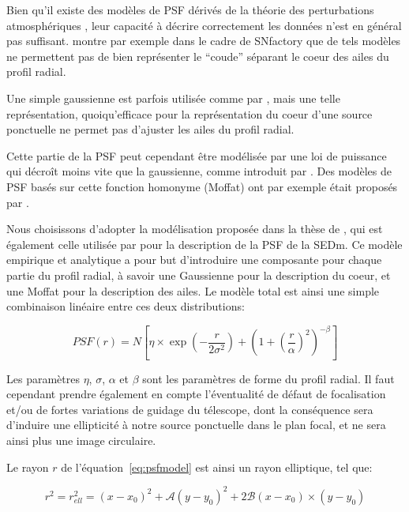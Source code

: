 \documentclass[../main/main.tex]{subfiles}
\begin{document}
Bien qu'il existe des modèles de PSF dérivés de la théorie des
perturbations atmosphériques \citep{Kolmogorov, Fried1966,Tokovinin},
leur capacité à décrire correctement les données n'est en général pas
suffisant. \citet{Butonthese} montre par exemple dans le cadre de
SNfactory que de tels modèles ne
permettent pas de bien représenter le ``coude'' séparant le coeur des ailes du profil radial.

Une simple gaussienne est parfois utilisée comme par \citet{King1971},
mais une telle représentation, quoiqu'efficace pour la représentation du
coeur d'une source ponctuelle ne permet pas d'ajuster les ailes du
profil radial.

Cette partie de la PSF peut cependant être modélisée par une
loi de puissance qui décroît moins vite que la gaussienne, comme
introduit par \citet{Moffat1969}. Des modèles de PSF basés sur cette
fonction homonyme (Moffat) ont par exemple était proposés par
\citet{Racine1996, Trujillo2001}.

Nous choisissons d'adopter la modélisation proposée dans la thèse de
\citet{Butonthese}, qui est également celle utilisée par \citet{pysedm}
pour la description de la PSF de la SEDm. Ce modèle empirique et
analytique a pour but d'introduire une composante pour chaque partie du
profil radial, à savoir une Gaussienne pour la description du coeur, et
une Moffat pour la description des ailes. Le modèle total est ainsi une
simple combinaison linéaire entre ces deux distributions:

\begin{equation}
  \label{eq:psfmodel}
  PSF(r) = N\left[\eta\times\exp\left(- \frac{r}{2\sigma^{2}}\right) +
    \left( 1+\left( \frac{r}{\alpha}\right)^{2}\right)^{-\beta} \right]
\end{equation}

Les paramètres $\eta$, $\sigma$, $\alpha$ et $\beta$ sont les paramètres
de forme du profil radial. Il faut cependant prendre également en compte
l'éventualité de défaut de focalisation et/ou de fortes variations de guidage du télescope, dont la conséquence sera
d'induire une ellipticité à notre source ponctuelle dans le plan focal,
et ne sera ainsi plus une image circulaire.

Le rayon $r$ de l'équation~\ref{eq:psfmodel} est ainsi un rayon
elliptique, tel que:

\begin{equation}
  \label{eq:ellipticity}
  r^{2}=r_{ell}^{2}=(x-x_{0})^{2}+\mathcal{A}(y-y_{0})^{2}+2\mathcal{B}(x-x_{0})\times(y-y_{0})
\end{equation}
\end{document}
